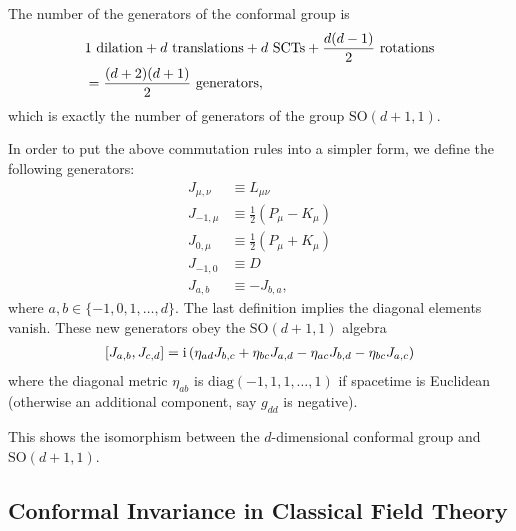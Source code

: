 \documentclass[10pt]{article}
\newcommand{\ii}{\mathrm{i}}
\begin{document}
\begin{remark}
    The number of the generators of the conformal group is
    \begin{align}
        &1\ \mathrm{dilation}+d\ \mathrm{translations}+d\ \mathrm{SCTs}+\frac{d(d-1)}{2}\ \mathrm{rotations}\notag\\
        &=\frac{(d+2)(d+1)}{2}\ \mathrm{generators},
    \end{align}
    which is exactly the number of generators of the group $\mathrm{SO}(d+1,1)$.

    In order to put the above commutation rules into a simpler form, we define the following generators\snm: 
    \begin{align}
        J_{\mu,\nu}&\equiv L_{\mu\nu}\\
        J_{-1,\mu}&\equiv \frac{1}{2}(P_\mu-K_\mu)\\
        J_{0,\mu}&\equiv \frac{1}{2}(P_\mu+K_\mu)\\
        J_{-1,0}&\equiv D\\
        J_{a,b}&\equiv-J_{b,a},
    \end{align}
    where $a,b\in\{-1,0,1,\dots,d\}$.
    The last definition implies the diagonal elements vanish.
    These new generators obey the $\mathrm{SO}(d+1,1)$ algebra 
    \begin{align}
        \comm{J_{a,b}}{J_{c,d}}=\ii\left(\eta_{ad}J_{b,c}+\eta_{bc}J_{a,d}-\eta_{ac}J_{b,d}-\eta_{bc}J_{a,c}\right)
    \end{align}
    where the diagonal metric $\eta_{ab}$ is $\mathrm{diag}(-1,1,1,\dots,1)$ if spacetime is Euclidean (otherwise an additional component, say $g_{dd}$ is negative).

    This shows the isomorphism between the $d$-dimensional conformal group and $\mathrm{SO}(d+1,1)$. 
\end{remark}



\subsection{Conformal Invariance in Classical Field Theory}
\end{document}
